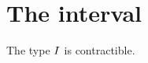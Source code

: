 \documentclass[hott-all.tex]{subfiles}
\begin{document}
\section{The interval}
% 
% 
% 
\begin{lem}
  The type $I$ is contractible.
\end{lem}
% 
\end{document}
